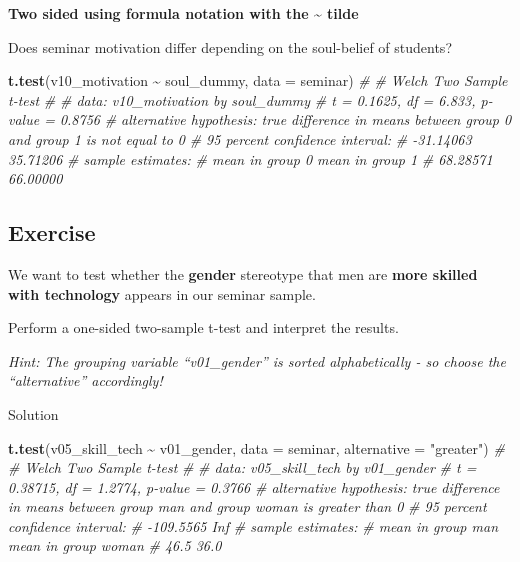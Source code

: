 \documentclass[
]{book}
\newenvironment{Shaded}{\begin{snugshade}}{\end{snugshade}}
\newcommand{\AttributeTok}[1]{\textcolor[rgb]{0.13,0.29,0.53}{#1}}
\newcommand{\CommentTok}[1]{\textcolor[rgb]{0.56,0.35,0.01}{\textit{#1}}}
\newcommand{\FunctionTok}[1]{\textcolor[rgb]{0.13,0.29,0.53}{\textbf{#1}}}
\newcommand{\NormalTok}[1]{#1}
\newcommand{\SpecialCharTok}[1]{\textcolor[rgb]{0.81,0.36,0.00}{\textbf{#1}}}
\newcommand{\StringTok}[1]{\textcolor[rgb]{0.31,0.60,0.02}{#1}}
\begin{document}
\textbf{Two sided using formula notation with the \textasciitilde{} tilde}

Does seminar motivation differ depending on the soul-belief of students?

\begin{Shaded}
\begin{Highlighting}[]
\FunctionTok{t.test}\NormalTok{(v10\_motivation }\SpecialCharTok{\textasciitilde{}}\NormalTok{ soul\_dummy, }\AttributeTok{data =}\NormalTok{ seminar)}
\CommentTok{\# }
\CommentTok{\#   Welch Two Sample t{-}test}
\CommentTok{\# }
\CommentTok{\# data:  v10\_motivation by soul\_dummy}
\CommentTok{\# t = 0.1625, df = 6.833, p{-}value = 0.8756}
\CommentTok{\# alternative hypothesis: true difference in means between group 0 and group 1 is not equal to 0}
\CommentTok{\# 95 percent confidence interval:}
\CommentTok{\#  {-}31.14063  35.71206}
\CommentTok{\# sample estimates:}
\CommentTok{\# mean in group 0 mean in group 1 }
\CommentTok{\#        68.28571        66.00000}
\end{Highlighting}
\end{Shaded}

\subsection{\texorpdfstring{Exercise }{Exercise }}\label{exercise-4}

We want to test whether the \textbf{gender} stereotype that men are \textbf{more skilled with technology} appears in our seminar sample.

Perform a one-sided two-sample t-test and interpret the results.

\emph{Hint: The grouping variable ``v01\_gender'' is sorted alphabetically - so choose the ``alternative'' accordingly!}

Solution

\begin{Shaded}
\begin{Highlighting}[]
\FunctionTok{t.test}\NormalTok{(v05\_skill\_tech }\SpecialCharTok{\textasciitilde{}}\NormalTok{ v01\_gender, }\AttributeTok{data =}\NormalTok{ seminar, }\AttributeTok{alternative =} \StringTok{"greater"}\NormalTok{)}
\CommentTok{\# }
\CommentTok{\#   Welch Two Sample t{-}test}
\CommentTok{\# }
\CommentTok{\# data:  v05\_skill\_tech by v01\_gender}
\CommentTok{\# t = 0.38715, df = 1.2774, p{-}value = 0.3766}
\CommentTok{\# alternative hypothesis: true difference in means between group man and group woman is greater than 0}
\CommentTok{\# 95 percent confidence interval:}
\CommentTok{\#  {-}109.5565       Inf}
\CommentTok{\# sample estimates:}
\CommentTok{\#   mean in group man mean in group woman }
\CommentTok{\#                46.5                36.0}
\end{Highlighting}
\end{Shaded}
\end{document}
